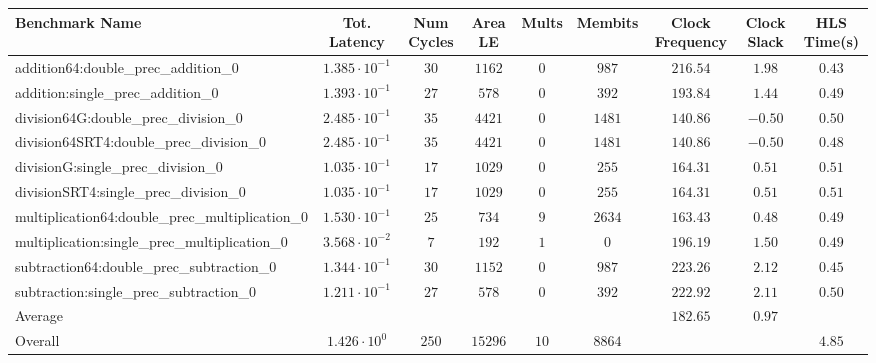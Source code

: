 \begin{tabular}{|l|c|c|c|c|c|c|c|c|}
\hline
Benchmark Name                                   & Tot. Latency            & Num Cycles & Area LE   & Mults  & Membits  & Clock Frequency & Clock Slack & HLS Time(s) \\
\hline
addition64:double\_prec\_addition\_0             & $ 1.385 \cdot 10^{-1} $ & $ 30     $ & $ 1162  $ & $ 0  $ & $ 987  $ & $ 216.54      $ & $ 1.98    $ & $ 0.43    $ \\
addition:single\_prec\_addition\_0               & $ 1.393 \cdot 10^{-1} $ & $ 27     $ & $ 578   $ & $ 0  $ & $ 392  $ & $ 193.84      $ & $ 1.44    $ & $ 0.49    $ \\
division64G:double\_prec\_division\_0            & $ 2.485 \cdot 10^{-1} $ & $ 35     $ & $ 4421  $ & $ 0  $ & $ 1481 $ & $ 140.86      $ & $ -0.50   $ & $ 0.50    $ \\
division64SRT4:double\_prec\_division\_0         & $ 2.485 \cdot 10^{-1} $ & $ 35     $ & $ 4421  $ & $ 0  $ & $ 1481 $ & $ 140.86      $ & $ -0.50   $ & $ 0.48    $ \\
divisionG:single\_prec\_division\_0              & $ 1.035 \cdot 10^{-1} $ & $ 17     $ & $ 1029  $ & $ 0  $ & $ 255  $ & $ 164.31      $ & $ 0.51    $ & $ 0.51    $ \\
divisionSRT4:single\_prec\_division\_0           & $ 1.035 \cdot 10^{-1} $ & $ 17     $ & $ 1029  $ & $ 0  $ & $ 255  $ & $ 164.31      $ & $ 0.51    $ & $ 0.51    $ \\
multiplication64:double\_prec\_multiplication\_0 & $ 1.530 \cdot 10^{-1} $ & $ 25     $ & $ 734   $ & $ 9  $ & $ 2634 $ & $ 163.43      $ & $ 0.48    $ & $ 0.49    $ \\
multiplication:single\_prec\_multiplication\_0   & $ 3.568 \cdot 10^{-2} $ & $ 7      $ & $ 192   $ & $ 1  $ & $ 0    $ & $ 196.19      $ & $ 1.50    $ & $ 0.49    $ \\
subtraction64:double\_prec\_subtraction\_0       & $ 1.344 \cdot 10^{-1} $ & $ 30     $ & $ 1152  $ & $ 0  $ & $ 987  $ & $ 223.26      $ & $ 2.12    $ & $ 0.45    $ \\
subtraction:single\_prec\_subtraction\_0         & $ 1.211 \cdot 10^{-1} $ & $ 27     $ & $ 578   $ & $ 0  $ & $ 392  $ & $ 222.92      $ & $ 2.11    $ & $ 0.50    $ \\
\hline
Average                                          & $                     $ & $        $ & $       $ & $    $ & $      $ & $ 182.65      $ & $ 0.97    $ & $         $ \\
\hline
Overall                                          & $ 1.426 \cdot 10^{0}  $ & $ 250    $ & $ 15296 $ & $ 10 $ & $ 8864 $ & $             $ & $         $ & $ 4.85    $ \\
\hline
\end{tabular}
